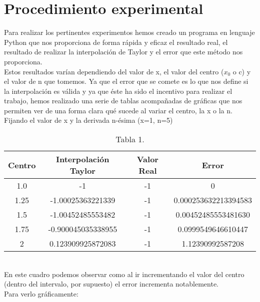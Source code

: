 \documentclass[spanish,a4paper,11pt,twoside]{report}
\begin{document}
\chapter{Procedimiento experimental}
\label{chapter:exp}
	Para realizar los pertinentes experimentos hemos creado un programa en lenguaje Python que nos proporciona de forma rápida y eficaz el resultado real, el resultado de realizar la interpolación de Taylor y el error que este método nos proporciona.\\ 
Estos resultados varían dependiendo del valor de x, el valor del centro ($x_0$  o c) y el valor de n que tomemos. Ya que el error que se comete es lo que nos define si la interpolación es válida y ya que éste ha sido el incentivo para realizar el trabajo, hemos realizado una serie de tablas acompañadas de gráficas que nos permiten ver de una forma clara qué sucede al variar el centro, la x o la n.\\
	Fijando el valor de x y la derivada n-ésima (x=1, n=5)\\
    \begin{table}[h]
	\begin{center}
	\begin{tabular}{||c|c|c|c||}
	\hline
    \hline
	Centro & Interpolación Taylor & Valor Real & Error \\
	\hline
	1.0 & -1 & -1 & 0\\
	\hline
	1.25 & -1.00025363221339 & -1 & 0.000253632213394583 \\
	\hline
	1.5 & -1.00452485553482 & -1 & 0.00452485553481630\\	
	\hline
	1.75 & -0.900045035338955 & -1 & 0.0999549646610447\\
	\hline
	2 & 0.123909925872083 & -1 & 1.12390992587208\\
	\hline
    \hline
    \end{tabular}
    \caption{Tabla 1.}
    \label{Tabla 1}
	\end{center}
	\end{table}\\
En este cuadro podemos observar como al ir incrementando el valor del centro (dentro del intervalo, por supuesto) el error incrementa notablemente.\\
 Para verlo gráficamente: \\
\end{document}
